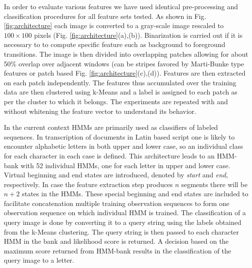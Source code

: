 \documentclass[runningheads]{llncs}
\begin{document}
In order to evaluate various features we have used identical pre-processing and classification procedures for all feature sets tested. As shown in Fig. {\ref{fig:architecture}} each image is converted to a gray-scale image rescaled to $100 \times 100$ pixels (Fig. {\ref{fig:architecture}}(a),(b)). Binarization is carried out if it is necessary to to compute specific feature such as background to foreground transitions. The image is
then divided into overlapping patches allowing for about 50\% overlap over adjacent windows (can be stripes favored by Marti-Bunke type features or patch based Fig. {\ref{fig:architecture}}(c),(d)). Features are then extracted on each patch independently. The features thus accumulated over the training data are then clustered using k-Means and a label is assigned to each patch as per the cluster to which it belongs. The experiments are repeated with and without whitening the feature vector to understand its behavior.

In the current context HMMs are primarily used as classifiers of labeled sequences. In transcription of documents in Latin based script one is likely to encounter alphabetic letters in both upper and lower case, so an individual class for each character in each case is defined. This architecture leads to an HMM-bank with 52 individual HMMs, one for each letter in upper and lower case. Virtual beginning and end states are introduced, denoted by \textit{start} and \textit{end}, respectively. In case the feature extraction step produces $n$ segments there will be $n + 2$ states in the HMMs. These special beginning and end states are included to facilitate concatenation multiple training observation sequences to form one observation sequence on which individual HMM is trained. The classification of a query image is done by converting it to a query string using the labels obtained from the k-Means clustering. The query string is then passed to each character HMM in the bank and likelihood score is returned. A decision based on the maximum score returned from HMM-bank results in the classification of the query image to a letter.\\
\end{document}
